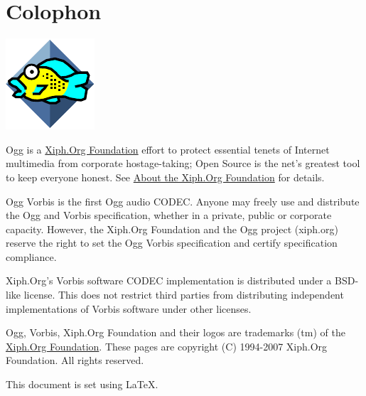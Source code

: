 \section*{Colophon}

\includegraphics{xifish} \label{footer}


Ogg is a \href{http://www.xiph.org/}{Xiph.Org Foundation} effort
to protect essential tenets of Internet multimedia from corporate
hostage-taking; Open Source is the net's greatest tool to keep
everyone honest. See \href{http://www.xiph.org/about.html}{About
the Xiph.Org Foundation} for details.


Ogg Vorbis is the first Ogg audio CODEC.  Anyone may freely use and
distribute the Ogg and Vorbis specification, whether in a private,
public or corporate capacity.  However, the Xiph.Org Foundation and
the Ogg project (xiph.org) reserve the right to set the Ogg Vorbis
specification and certify specification compliance.

Xiph.Org's Vorbis software CODEC implementation is distributed under a
BSD-like license.  This does not restrict third parties from
distributing independent implementations of Vorbis software under
other licenses.

Ogg, Vorbis, Xiph.Org Foundation and their logos are trademarks (tm)
of the \href{http://www.xiph.org/}{Xiph.Org Foundation}.  These
pages are copyright (C) 1994-2007 Xiph.Org Foundation. All rights
reserved.

This document is set using \LaTeX.